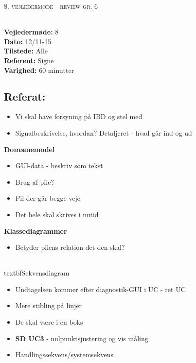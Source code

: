 \documentclass[a4paper,11pt,oneside]{memoir}
\begin{document}
\newpage


\begin{center} 
\huge{\textsc{8. vejledermøde - review gr. 6}}
\end{center}

\textbf{ }
\\
\textbf{Vejledermøde:} 8
\\
\textbf{Dato:} 12/11-15
\\
\textbf{Tilstede:} Alle
\\
\textbf{Referent:} Signe
\\
\textbf{Varighed:} 60 minutter
\\

\subsection{Referat:}
\begin{itemize}
\item Vi skal have forsyning på IBD og stel med 
\item Signalbeskrivelse, hvordan? Detaljeret - hvad går ind og ud
\end{itemize}

\textbf{Domænemodel}
\begin{itemize}
\item GUI-data - beskriv som tekst
\item Brug af pile? 
\item Pil der går begge veje 
\item Det hele skal skrives i nutid
\end{itemize}

\textbf{Klassediagrammer}
\begin{itemize}
\item Betyder pilens relation det den skal? 
\end{itemize}

\\textbf{Sekvensdiagram}
\begin{itemize}
\item Undtagelsen kommer efter diagnostik-GUI i UC - ret UC
\item Mere stibling på linjer
\item De skal være i en boks
\item \textbf{SD UC3} - nulpunktsjustering og vis måling
\item Handlingssekvens/systemsekvens 
\end{itemize}
\end{document}
